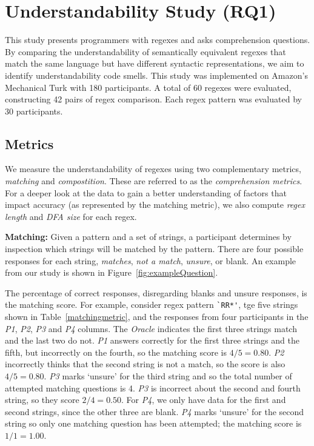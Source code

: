 

\section{Understandability Study (RQ1)}
\label{sec:rq1}
This study presents programmers with regexes and asks comprehension questions. By comparing the understandability of semantically equivalent regexes that match the same language but have different syntactic representations, we aim to identify understandability code smells.
This study was implemented on Amazon's Mechanical Turk with 180 participants. A total of 60 regexes were evaluated, constructing 42 pairs of regex comparison. Each regex pattern was evaluated by 30 participants.







\subsection{Metrics}
\label{sec:understadningmetric}
 We measure the understandability of regexes using two complementary metrics, \emph{matching} and \emph{compostition}. These are referred to as the \emph{comprehension metrics}. 
For a deeper look at the data to gain a better understanding of factors that impact accuracy (as represented by the matching metric), we also compute \emph{regex length} and \emph{DFA size} for each regex. 


\textbf{Matching:}
 Given a pattern and a set of strings, a participant determines by inspection which strings will be matched by the pattern. There are four possible responses for each string, \emph{matches}, \emph{not a match}, \emph{unsure}, or blank. An example from our study is shown in Figure~\ref{fig:exampleQuestion}.

 The percentage of correct responses, disregarding blanks and unsure responses, is the matching score.
 For example, consider regex pattern \verb!`RR*'!, tge five strings shown in Table~\ref{matchingmetric}, and the responses from four participants in the \emph{P1}, \emph{P2}, \emph{P3} and \emph{P4} columns.
 The {\em Oracle} indicates the first three strings match and the last two do not. \emph{P1} answers correctly for the first three strings and the fifth, but incorrectly on the fourth, so the matching score is $4/5 = 0.80$. \emph{P2} incorrectly thinks that the second string is not a match, so the score is also $4/5 = 0.80$.  \emph{P3} marks `unsure' for the third string and so the total number of attempted matching questions is 4. \emph{P3} is incorrect about the second and fourth string, so they score $2/4 = 0.50$.  For \emph{P4}, we only have data for the first and second strings, since the other three are blank.  \emph{P4} marks `unsure' for the second string so only one matching question has been attempted;  the matching score is $1/1 = 1.00$.

